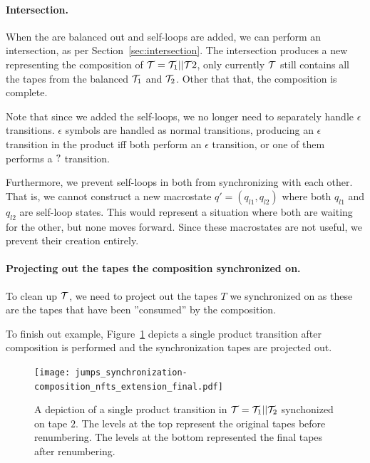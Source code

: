 \paragraph{Intersection.}
When the \nfts are balanced out and self-loops are added, we can perform an \nft intersection, as per Section~\ref{sec:intersection}.
The intersection produces a new \nft representing the composition of $\mathcal{T} = \mathcal{T}_1 || \mathcal{T}2$, only currently $\mathcal{T}$ still contains all the tapes from the balanced $\mathcal{T}_1$ and $\mathcal{T}_2$.
Other that that, the composition is complete.

Note that since we added the self-loops, we no longer need to separately handle $\epsilon$ transitions.
$\epsilon$ symbols are handled as normal transitions, producing an $\epsilon$ transition in the product iff both \nfts perform an $\epsilon$ transition, or one of them performs a $?$ transition.

Furthermore, we prevent self-loops in both \nfts from synchronizing with each other.
 That is, we cannot construct a new macrostate $q' = (q_{l1}, q_{l2})$ where both $q_{l1}$ and $q_{l2}$ are self-loop states.
This would represent a situation where both \nfts are waiting for the other, but none moves forward.
Since these macrostates are not useful, we prevent their creation entirely.

\paragraph{Projecting out the tapes the composition synchronized on.}
To clean up $\mathcal{T}$, we need to project out the tapes $T$ we synchronized on as these are the tapes that have been ''consumed'' by the composition.

\begin{example}
  To finish out example, Figure~\ref{fig:composition_nfts_extension_final} depicts a single product transition after composition is performed and the synchronization tapes are projected out.
  \begin{figure}[ht]
    \centering
    \texttt{[image: jumps\_synchronization-composition\_nfts\_extension\_final.pdf]}
    \caption{
      A depiction of a single product transition in $\mathcal{T} = \mathcal{T}_1 || \mathcal{T}_2$ synchonized on tape $2$.
      The levels at the top represent the original tapes before renumbering.
      The levels at the bottom represented the final tapes after renumbering.
    }
    \label{fig:composition_nfts_extension_final}
  \end{figure}
\end{example}

